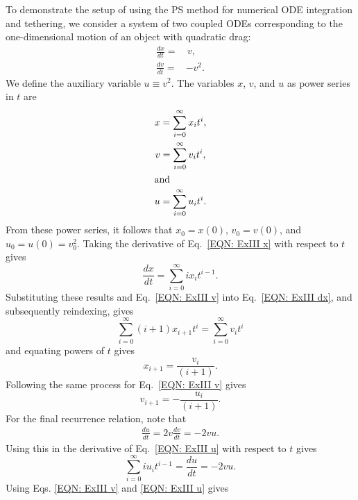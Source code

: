 \documentclass[draft]{agujournal2019}
\begin{document}
To demonstrate the setup of using the PS method for numerical ODE integration and tethering, we consider a system of two coupled ODEs corresponding to the one-dimensional motion of an object with quadratic drag:
    \begin{align}
            \frac{dx}{dt}=&\,v,\label{EQN: ExIII dx} \\
            \frac{dv}{dt}=&-v^2\nonumber.
    \end{align}
We define the auxiliary variable $u\equiv v^2$. The variables $x$, $v$, and $u$ as power series in $t$ are
    \begin{gather}
        x=\sum_{i=0}^\infty x_it^i \label{EQN: ExIII x},\\
        v=\sum_{i=0}^\infty v_it^i \label{EQN: ExIII v},\\
     \intertext{and}    
        u=\sum_{i=0}^\infty u_it^i  \label{EQN: ExIII u}.
    \end{gather}
From these power series, it follows that $x_0=x(0)$, $v_0=v(0)$, and $u_0=u(0)=v_0^2$. Taking the derivative of Eq.~\eqref{EQN: ExIII x} with respect to $t$ gives
    \begin{equation*}
        \frac{dx}{dt}=\sum_{i=0}^\infty ix_{i}t^{i-1}.
    \end{equation*}
Substituting these results and Eq.~\eqref{EQN: ExIII v} into Eq.~\eqref{EQN: ExIII dx}, and subsequently reindexing, gives  
    \begin{equation*}\label{EQN: ExIII sumvsumx}
        \sum_{i=0}^\infty (i+1)x_{i+1}t^{i}=\sum_{i=0}^\infty v_it^i  
    \end{equation*}
and equating powers of $t$ gives
    \begin{equation}\label{EQN: ExIII xi}
        x_{i+1}= \frac{v_i}{(i+1)}. 
    \end{equation}
Following the same process for Eq.~\eqref{EQN: ExIII v} gives
    \begin{equation}\label{EQN: ExIII vi}
        v_{i+1}= -\frac{u_i}{(i+1)}. 
    \end{equation}
For the final recurrence relation, note that
    \begin{align*}
        \frac{du}{dt}=2v\frac{dv}{dt}=-2vu.
    \end{align*}
Using this in the derivative of Eq.~\eqref{EQN: ExIII u} with respect to $t$ gives 
    \begin{equation*}
         \sum_{i=0}^\infty iu_it^{i-1}=\frac{du}{dt}=-2vu. 
    \end{equation*} 
Using Eqs. \eqref{EQN: ExIII v} and \eqref{EQN: ExIII u} gives
\end{document}
